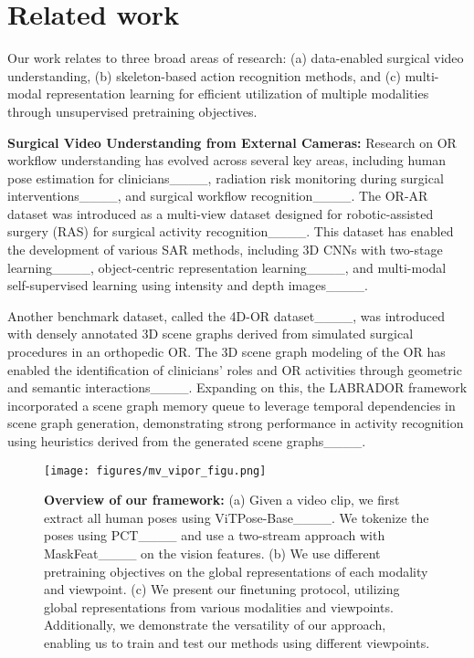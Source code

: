 \section{Related work}
Our work relates to three broad areas of research: (a) data-enabled surgical video understanding, (b) skeleton-based action recognition methods, and (c) multi-modal representation learning for efficient utilization of multiple modalities through unsupervised pretraining objectives. 

\noindent \textbf{Surgical Video Understanding from External Cameras: } Research on OR workflow understanding has evolved across several key areas, including human pose estimation for clinicians____, radiation risk monitoring during surgical interventions____, and surgical workflow recognition____. The OR-AR dataset was introduced as a multi-view dataset designed for robotic-assisted surgery (RAS) for surgical activity recognition____. This dataset has enabled the development of various SAR methods, including 3D CNNs with two-stage learning____, object-centric representation learning____, and multi-modal self-supervised learning using intensity and depth images____.

Another benchmark dataset, called the 4D-OR dataset____, was introduced with densely annotated 3D scene graphs derived from simulated surgical procedures in an orthopedic OR. The 3D scene graph modeling of the OR has enabled the identification of clinicians' roles and OR activities through geometric and semantic interactions____. Expanding on this, the LABRADOR framework incorporated a scene graph memory queue to leverage temporal dependencies in scene graph generation, demonstrating strong performance in activity recognition using heuristics derived from the generated scene graphs____.

\begin{figure*}[t!]
    \centering
    \texttt{[image: figures/mv\_vipor\_figu.png]}
    \caption{\textbf{Overview of our framework:} (a) Given a video clip, we first extract all human poses using ViTPose-Base____. We tokenize the poses using PCT____ and use a two-stream approach with MaskFeat____ on the vision features. (b) We use different pretraining objectives on the global representations of each modality and viewpoint. (c) We present our finetuning protocol, utilizing global representations from various modalities and viewpoints. Additionally, we demonstrate the versatility of our approach, enabling us to train and test our methods using different viewpoints.}
    \label{fig:enter-label}
\end{figure*}

